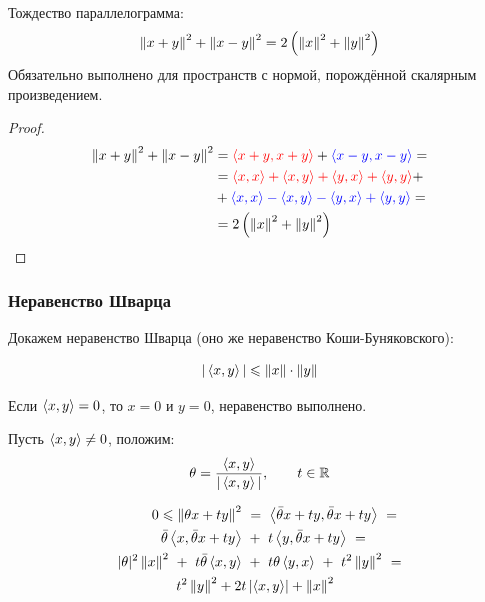 \documentclass[12pt]{article}
\begin{document}
			\begin{state}
				Тождество параллелограмма:
				\begin{equation}
					\label{eq:Parall}
					\left\| x+y \right\|^2 + \left\| x-y \right\|^2 = 2 \left(\left\| x \right\|^2 + \left\| y \right\|^2\right)
				\end{equation}
				Обязательно выполнено для пространств с нормой, порождённой скалярным произведением.
			\end{state}

			\begin{proof}
				\begin{equation*}
					\begin{split}
						\left\| x+y \right\|^2 + \left\| x-y \right\|^2 &= {\color{red}\left\langle x+y, x+y \right\rangle}+{\color{blue}\left\langle x-y, x-y \right\rangle} = \\
						&= {\color{red}\left\langle x, x \right\rangle+\left\langle x, y \right\rangle+\left\langle y, x \right\rangle+\left\langle y, y \right\rangle} + \\
						&+ {\color{blue}\left\langle x, x \right\rangle-\left\langle x, y \right\rangle-\left\langle y, x \right\rangle+\left\langle y, y \right\rangle} = \\
						&= 2 \left(\left\| x \right\|^2 + \left\| y \right\|^2\right) \\
					\end{split}
				\end{equation*}
			\end{proof}

		\subsubsection{Неравенство Шварца}

			Докажем неравенство Шварца (оно же неравенство Коши-Буняковского):

			$$|\left\langle x, y \right\rangle| \leqslant \left\| x \right\| \cdot \left\| y \right\|$$


			Если $\left\langle x, y \right\rangle = 0$, то $x=0$ и $y=0$, неравенство выполнено.

			Пусть $\left\langle x, y \right\rangle \neq 0$, положим:
			$$\theta = \frac{\left\langle x, y \right\rangle}{|\left\langle x, y \right\rangle|},\qquad t \in \mathbb{R}$$

			\begin{align*}
				0 \leqslant \left\| 
				{\theta} x + t y \right\|^2 ~&=~ \left\langle \bar{\theta} x + t y, \bar{\theta} x + t y \right\rangle ~= \\
				\bar{\theta} \left\langle x, \bar{\theta} x + t y \right\rangle ~&+~ t \left\langle y, \bar{\theta} x + t y \right\rangle ~= \\
				|\theta|^2 \left\| x \right\|^2 ~+~ t \bar{\theta} \left\langle x, y \right\rangle ~&+~ t \theta \left\langle y, x \right\rangle ~+~ t^2 \left\| y \right\|^2 ~= \\
				t^2 \left\| y \right\|^2 + 2t &\left| \left\langle x, y \right\rangle \right| + \left\| x \right\|^2
			\end{align*}
\end{document}
